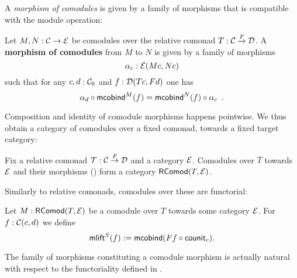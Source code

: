 \documentclass{amsart}
\newcommand{\fat}[1]{\textbf{#1}}
\begin{document}
A \emph{morphism of comodules} is given by a family of morphisms that is compatible with 
the module operation:

\begin{definition}\label{def:morphism_of_comodules}
 Let $M, N : \C \to \E$ be comodules over the relative comonad $T : \C \stackrel{F}{\to} \D$.
 A \fat{morphism of comodules} from $M$ to $N$ is given by a family of morphisms 
   \[ \alpha_c:\E(Mc,Nc) \]
 such that for any $c,d:\C_0$ and $f : \D(Tc,Fd)$ one has
 \[   \comp{\mcobind^M(f)}{\alpha_d} = \comp{\alpha_c}{\mcobind^N(f)} \enspace . \]
\end{definition}


Composition and identity of comodule morphisms happens pointwise. We thus obtain a category of comodules
over a fixed comonad, towards a fixed target category:

\begin{remark}
 Fix a relative comonad $\T : \C\stackrel{F}{\to}\D$ and a category $\E$.
 Comodules over $T$ towards $\E$ and their morphisms () form a category $\RComod(T,\E)$.
\end{remark}

Similarly to relative comonads, comodules over these are functorial:

\begin{definition}\label{def:comodule_lift}
 Let $M : \RComod(T,\E)$ be a comodule over $T$ towards some category $\E$. For $f : \C(c,d)$ we define
  \[ \mlift^S(f) := \mcobind(\comp{\counit_c}{Ff}) .  \]
\end{definition}


\begin{remark}
  The family of morphisms constituting a comodule morphism is actually natural with respect to the functoriality 
  defined in .
\end{remark}




\end{document}
